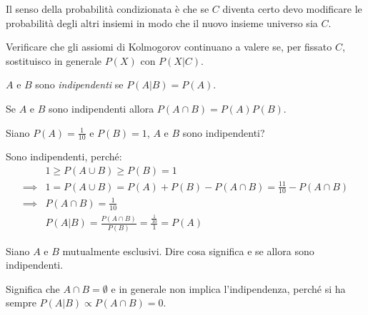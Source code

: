 \noindent Il senso della probabilità condizionata è che se $C$ diventa certo
devo modificare le probabilità degli altri insiemi in modo che il nuovo insieme universo sia $C$.

\begin{exercise}
	Verificare che gli assiomi di Kolmogorov continuano a valere se, per fissato $C$, sostituisco in generale $P(X)$ con $P(X|C)$.
\end{exercise}

\begin{definition}[Indipendenza]
	$A$ e $B$ sono \emph{indipendenti} se $P(A|B) = P(A)$.
\end{definition}

\begin{exercise}
	Se $A$ e $B$ sono indipendenti allora $P(A\cap B) = P(A)P(B)$.
\end{exercise}

\begin{exercise}
	Siano $P(A)=\frac1{10}$ e $P(B)=1$, $A$ e $B$ sono indipendenti?
\end{exercise}

\begin{solution}
	Sono indipendenti, perché:
	\begin{align*}
		&1 \ge P(A\cup B) \ge P(B) = 1 \\
		\implies &1 = P(A\cup B) = P(A) + P(B) - P(A\cap B) = \frac{11}{10} - P(A\cap B) \\
		\implies &P(A\cap B) = \frac{1}{10} \\
		&P(A|B) = \frac{P(A\cap B)}{P(B)} = \frac{\frac{1}{10}}{1} = P(A)
	\end{align*}
\end{solution}

\begin{exercise}
	Siano $A$ e $B$ mutualmente esclusivi. Dire cosa significa e se allora sono indipendenti.
\end{exercise}

\begin{solution}
	Significa che $A\cap B=\emptyset$ e in generale non implica l'indipendenza, perché si ha sempre $P(A|B)\propto P(A\cap B)=0$.
\end{solution}
